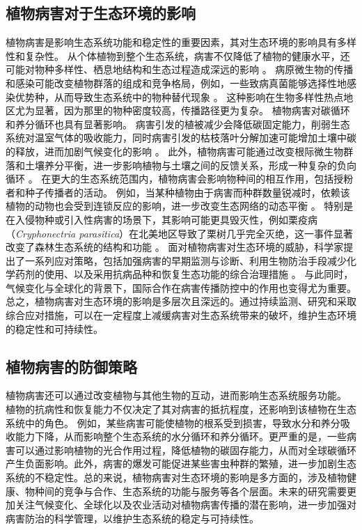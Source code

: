 \documentclass[AutoFakeBold]{LZUThesis-PgD&PhD}
\begin{document}
	
	\subsection{植物病害对于生态环境的影响}
	
	植物病害是影响生态系统功能和稳定性的重要因素，其对生态环境的影响具有多样性和复杂性。
	从个体植物到整个生态系统，病害不仅降低了植物的健康水平，还可能对物种多样性、栖息地结构和生态过程造成深远的影响 \cite{Mitchell2002}。
	病原微生物的传播和感染可能改变植物群落的组成和竞争格局，例如，一些致病真菌能够选择性地感染优势种，从而导致生态系统中的物种替代现象 \cite{Garrett2006}。
	这种影响在生物多样性热点地区尤为显著，因为那里的物种密度较高，传播路径更为复杂。
	植物病害对碳循环和养分循环也具有显著影响。
	病害引发的植被减少会降低碳固定能力，削弱生态系统对温室气体的吸收能力，同时病害引发的枯枝落叶分解加速可能增加土壤中碳的释放，进而加剧气候变化的影响 \cite{Allison2008}。
	此外，植物病害可能通过改变根际微生物群落和土壤养分平衡，进一步影响植物与土壤之间的反馈关系，形成一种复杂的负向循环 \cite{Bever2010}。
	在更大的生态系统范围内，植物病害会影响物种间的相互作用，包括授粉者和种子传播者的活动。
	例如，当某种植物由于病害而种群数量锐减时，依赖该植物的动物也会受到连锁反应的影响，进一步改变生态网络的动态平衡 \cite{Maron2011}。
	特别是在入侵物种或引入性病害的场景下，其影响可能更具毁灭性，例如栗疫病（\textit{Cryphonectria parasitica}）在北美地区导致了栗树几乎完全灭绝，这一事件显著改变了森林生态系统的结构和功能 \cite{Anagnostakis1987}。
	面对植物病害对生态环境的威胁，科学家提出了一系列应对策略，包括加强病害的早期监测与诊断、利用生物防治手段减少化学药剂的使用、以及采用抗病品种和恢复生态功能的综合治理措施 \cite{Pautasso2010}。
	与此同时，气候变化与全球化的背景下，国际合作在病害传播防控中的作用也变得尤为重要。
	总之，植物病害对生态环境的影响是多层次且深远的。通过持续监测、研究和采取综合应对措施，可以在一定程度上减缓病害对生态系统带来的破坏，维护生态环境的稳定性和可持续性。
	
	
	
	\subsection{植物病害的防御策略}
	
	植物病害还可以通过改变植物与其他生物的互动，进而影响生态系统服务功能。
	植物的抗病性和恢复能力不仅决定了其对病害的抵抗程度，还影响到该植物在生态系统中的角色。
	例如，某些病害可能使植物的根系受到损害，导致水分和养分吸收能力下降，从而影响整个生态系统的水分循环和养分循环\cite{Schultz2010}。更严重的是，一些病害可以通过影响植物的光合作用过程，降低植物的碳固存能力，从而对全球碳循环产生负面影响\cite{Barton2011}。此外，病害的爆发可能促进某些害虫种群的繁殖，进一步加剧生态系统的不稳定性。总的来说，植物病害对生态环境的影响是多方面的，涉及植物健康、物种间的竞争与合作、生态系统的功能与服务等各个层面。未来的研究需要更加关注气候变化、全球化以及农业活动对植物病害传播的潜在影响，进一步加强对病害防治的科学管理，以维护生态系统的稳定与可持续性。
\end{document}
